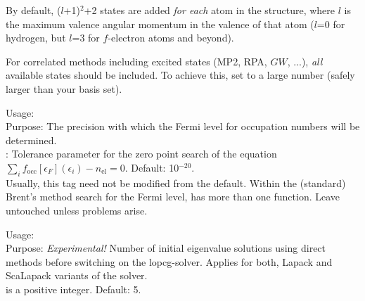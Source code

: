 By default, ($l$+1)$^2$+2 states are added \emph{for each} atom in the
structure, where $l$ is the maximum valence angular momentum in the valence of
that atom ($l$=0 for hydrogen, but $l$=3 for $f$-electron atoms and beyond). 

For correlated methods including excited states (MP2, RPA, $GW$, ...),
\emph{all} available states should be included. To achieve this, set
 to a large number (safely larger than your
basis set).

{
  \noindent
  Usage:   \\[1.0ex]
  Purpose: The precision with which the Fermi level for occupation
    numbers will be determined. \\[1.0ex]
   : Tolerance parameter for the zero point search of
  the equation $\sum_i f_\text{occ}[\epsilon_F](\epsilon_i) -
  n_\text{el} = 0$. Default: 10$^{-20}$. \\
}
Usually, this tag need not be modified from the default. Within the
(standard) Brent's method search for the Fermi level,
 has more than one function. Leave untouched unless
problems arise.

{ 
  \noindent
  Usage:   \\[1.0ex]
  Purpose: \emph{Experimental!} Number of initial eigenvalue solutions using
    direct methods before switching on the lopcg-solver. Applies for both, Lapack
    and ScaLapack variants of the solver. \\[1.0ex]
   is a positive integer.  Default: 5. \\
} 

